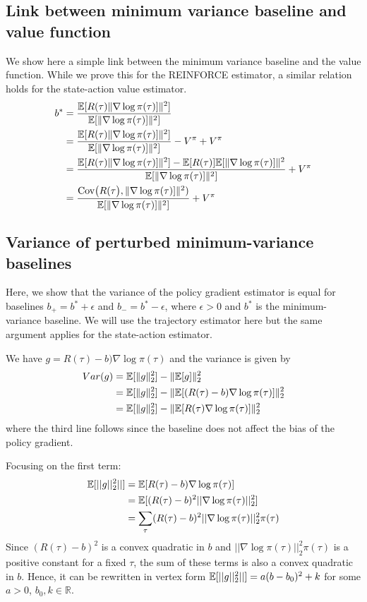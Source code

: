 \subsection{Link between minimum variance baseline and value function}
\label{app:value_minvar_baseline}
We show here a simple link between the minimum variance baseline and the value function. While we prove this for the REINFORCE estimator, a similar relation holds for the state-action value estimator.
\begin{align*}
    b^\ast &= \frac{ \mathbb{E} [R(\tau) \| \nabla \log \pi (\tau)]\|^2] }{ \mathbb{E} [\| \nabla \log \pi (\tau)]\|^2] }\\
     &= \frac{ \mathbb{E} [R(\tau) \| \nabla \log \pi (\tau)]\|^2] }{ \mathbb{E} [\| \nabla \log \pi (\tau)]\|^2] } - V^\pi + V^\pi\\
     &=  \frac{ \mathbb{E} [R(\tau) \| \nabla \log \pi (\tau)]\|^2]  - \mathbb{E}[R(\tau)] \mathbb{E} [\| \nabla \log \pi (\tau)]\|^2 }{ \mathbb{E} [\| \nabla \log \pi (\tau)]\|^2] } + V^\pi\\
     &=  \frac{\text{Cov}\big(R(\tau\big), \| \nabla \log \pi (\tau)]\|^2)}{ \mathbb{E} [\| \nabla \log \pi (\tau)]\|^2] } + V^\pi\\
\end{align*}

\subsection{Variance of perturbed minimum-variance baselines} \label{app:var_perturbed_baseline}
Here, we show that the variance of the policy gradient estimator is equal for baselines $b_+ = b^* + \epsilon$ and $b_- = b^* - \epsilon$, where $\epsilon > 0$ and $b^*$ is the minimum-variance baseline.
We will use the trajectory estimator here but the same argument applies for the state-action estimator. 

We have $g = R(\tau) -b) \nabla \log \pi (\tau) $ and the variance is given by
\begin{align*}
    Var(g) &= \mathbb{E}[ \|g\|^2_2] - \| \mathbb{E}[g] \|^2_2 \\ 
    &= \mathbb{E}[ \|g\|^2_2] - \| \mathbb{E}[(R(\tau) -b) \nabla \log \pi (\tau)] \|^2_2  \\
    &= \mathbb{E}[ \|g\|^2_2] - \| \mathbb{E}[R(\tau) \nabla \log \pi (\tau)] \|^2_2 
\end{align*}
where the third line follows since the baseline does not affect the bias of the policy gradient.

Focusing on the first term:
\begin{align*}
    \mathbb{E} [||g||^2_2 ||] &= \mathbb{E} [R(\tau) -b) \nabla \log \pi (\tau) ] \\
    &= \mathbb{E}[ (R(\tau) -b)^2 ||\nabla \log \pi (\tau) ||^2_2 ] \\
    &= \sum_\tau  (R(\tau) -b)^2 ||\nabla \log \pi (\tau) ||^2_2 \pi (\tau) 
\end{align*}
Since $(R(\tau) -b)^2$ is a convex quadratic in $b$ and $||\nabla \log \pi (\tau)||^2_2 \pi (\tau)$ is a positive constant for a fixed $\tau$, the sum of these terms is also a convex quadratic in $b$.
Hence, it can be rewritten in vertex form $\mathbb{E} [||g||^2_2 ||] = a (b-b_0)^2 + k$ for some $a > 0$, $b_0, k \in \mathbb{R}$.

